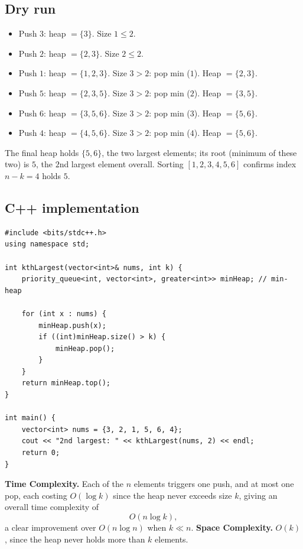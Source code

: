 \subsection*{Dry run}


\begin{itemize}
  \item Push $3$: heap $=\{3\}$. Size $1 \le 2$.
  \item Push $2$: heap $=\{2,3\}$. Size $2 \le 2$.
  \item Push $1$: heap $=\{1,2,3\}$. Size $3>2$: pop min ($1$). Heap
        $=\{2,3\}$.
  \item Push $5$: heap $=\{2,3,5\}$. Size $3>2$: pop min ($2$). Heap
        $=\{3,5\}$.
  \item Push $6$: heap $=\{3,5,6\}$. Size $3>2$: pop min ($3$). Heap
        $=\{5,6\}$.
  \item Push $4$: heap $=\{4,5,6\}$. Size $3>2$: pop min ($4$). Heap
        $=\{5,6\}$.
\end{itemize}

The final heap holds $\{5,6\}$, the two largest elements; its root
(minimum of these two) is $5$, the $2$nd largest element overall. Sorting
$[1,2,3,4,5,6]$ confirms index $n-k=4$ holds $5$.

\subsection*{C++ implementation}

\begin{lstlisting}
#include <bits/stdc++.h>
using namespace std;

int kthLargest(vector<int>& nums, int k) {
    priority_queue<int, vector<int>, greater<int>> minHeap; // min-heap

    for (int x : nums) {
        minHeap.push(x);
        if ((int)minHeap.size() > k) {
            minHeap.pop();
        }
    }
    return minHeap.top();
}

int main() {
    vector<int> nums = {3, 2, 1, 5, 6, 4};
    cout << "2nd largest: " << kthLargest(nums, 2) << endl;
    return 0;
}
\end{lstlisting}

\begin{complexitybox}
\textbf{Time Complexity.} Each of the $n$ elements triggers one push, and
at most one pop, each costing $O(\log k)$ since the heap never exceeds
size $k$, giving an overall time complexity of
\[
  O(n \log k),
\]
a clear improvement over $O(n \log n)$ when $k \ll n$.
\textbf{Space Complexity.} $O(k)$, since the heap never holds more than
$k$ elements.
\end{complexitybox}


